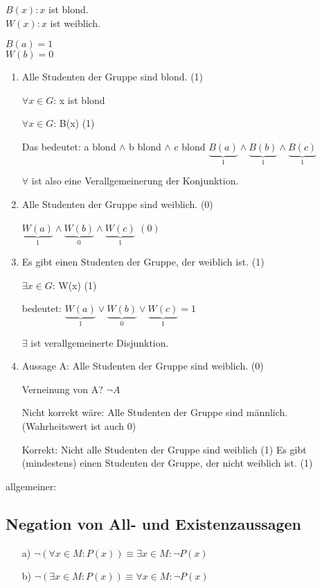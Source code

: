\documentclass[a4paper, 12pt, twoside] {article}
\newcommand{\attention}{{\fontencoding{U}\fontfamily{futs}\selectfont\char 66\relax}\space}
\begin{document}
$B(x): x$ ist blond. \\
$W(x): x$ ist weiblich.

$B(a) = 1$ \\
$W(b) = 0$

\begin{enumerate}

\item Alle Studenten der Gruppe sind blond. (1)

$\forall x \in G$: x ist blond

$\forall x \in G$: B(x) (1)

Das bedeutet:
a blond $\wedge$ b blond $\wedge$ c blond \newline
$\underbrace{B(a)}_{1} \wedge \underbrace{B(b)}_{1} \wedge \underbrace{B(c)}_{1}$

$\forall$ ist also eine Verallgemeinerung der Konjunktion.

\item Alle Studenten der Gruppe sind weiblich. (0)

$\underbrace{W(a)}_{1} \wedge \underbrace{W(b)}_{0} \wedge \underbrace{W(c)}_{1}$ $(0)$

\item Es gibt einen Studenten der Gruppe, der weiblich ist. (1)

$\exists x \in G$: W(x) (1)

bedeutet: $\underbrace{W(a)}_{1} \lor \underbrace{W(b)}_{0} \lor \underbrace{W(c)}_{1} = 1$

$\exists$ ist verallgemeinerte Disjunktion.

\item Aussage A: Alle Studenten der Gruppe sind weiblich. (0)

Verneinung von A? $\neg A$

\attention Nicht korrekt wäre: Alle Studenten der Gruppe sind männlich. (Wahrheitswert ist auch 0)

Korrekt: Nicht alle Studenten der Gruppe sind weiblich (1)
Es gibt (mindestens) einen Studenten der Gruppe, der nicht weiblich ist. (1)

\end{enumerate}

allgemeiner:

\subsection{Negation von All- und Existenzaussagen} %

\begin{itemize}
\item[a)] $\neg (\forall x \in M: P(x)) \equiv \exists x \in M: \neg P(x)$
\item[b)] $\neg (\exists x \in M: P(x)) \equiv \forall x \in M : \neg P(x)$
\end{itemize}
\end{document}
